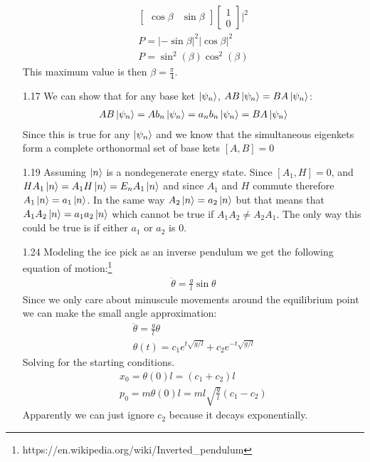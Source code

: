 \documentclass[12pt]{article}
\begin{document}
\begin{enumerate}
\begin{gather*}
      \begin{bmatrix}
        \cos\beta & \sin\beta
      \end{bmatrix}
      \begin{bmatrix}
        1 \\
        0
      \end{bmatrix}|^2\\
      P=|-\sin\beta|^2|\cos\beta|^2\\
      P=\sin^2(\beta)\cos^2(\beta)
    \end{gather*}
    This maximum value is then $\beta=\frac{\pi}{4}$.
    \item[1.17]
    We can show that for any base ket $\ket{\psi_n}$, $AB\ket{\psi_n}=BA\ket{\psi_n}$:
    \begin{gather*}
      AB\ket{\psi_n}=Ab_n\ket{\psi_n}=a_n b_n\ket{\psi_n}=BA\ket{\psi_n}
    \end{gather*}
    Since this is true for any $\ket{\psi_n}$ and we know that the simultaneous eigenkets form a complete orthonormal set of base kets $[A, B]=0$
    \item[1.19]
    Assuming $\ket{n}$ is a nondegenerate energy state.
    Since $[A_1,H]=0$, and $HA_1\ket{n}=A_1 H\ket{n}=E_n A_1\ket{n}$ and since $A_1$ and $H$ commute therefore $A_1\ket{n}=a_1\ket{n}$.
    In the same way $A_2\ket{n}=a_2\ket{n}$ but that means that $A_1 A_2\ket{n}=a_1 a_2\ket{n}$ which cannot be true if $A_1 A_2\neq A_2 A_1$.
    The only way this could be true is if either $a_1$ or $a_2$ is 0.
    \item[1.24]
    Modeling the ice pick as an inverse pendulum we get the following equation of motion:\footnote{https://en.wikipedia.org/wiki/Inverted\_pendulum}
    \begin{gather*}
      \ddot{\theta}=\frac{g}{l}\sin\theta
    \end{gather*}
    Since we only care about minuscule movements around the equilibrium point we can make the small angle approximation:
    \begin{gather*}
      \ddot{\theta}=\frac{g}{l}\theta\\
      \theta(t)=c_1 e^{t\sqrt{g/l}}+c_2 e^{-t\sqrt{g/l}}
    \end{gather*}
    Solving for the starting conditions.
    \begin{gather*}
      x_0=\theta(0)l=(c_1+c_2)l\\
      p_0=m\theta(0)l=ml\sqrt{\frac{g}{l}}(c_1-c_2)
    \end{gather*}
    Apparently we can just ignore $c_2$ because it decays exponentially.

\end{enumerate}
\end{document}
